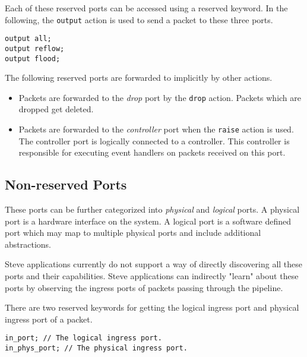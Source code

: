 Each of these reserved ports can be accessed using a reserved keyword. In the
following, the \texttt{output} action is used to send a packet to these three
ports.

\begin{codepage}
\begin{lstlisting}
output all;
output reflow;
output flood;
\end{lstlisting}
\end{codepage}

The following reserved ports are forwarded to implicitly by other actions.

\begin{itemize}
\item Packets are forwarded to the \textit{drop} port by the \texttt{drop} action.
Packets which are dropped get deleted.

\item Packets are forwarded to the \textit{controller} port when the 
\texttt{raise} action is used.
The controller port is logically connected to a controller.
This controller is responsible for executing event handlers on packets
received on this port. 
\end{itemize}

\subsection{Non-reserved Ports} \label{tut:regular_ports}

These ports can be further categorized into \textit{physical} and
\textit{logical} ports. A physical port is a hardware interface on the system. A
logical port is a software defined port which may map to multiple physical ports
and include additional abstractions.

Steve applications currently do not support a way of directly discovering all
these ports and their capabilities. Steve applications can indirectly "learn"
about these ports by observing the ingress ports of packets passing
through the pipeline.

There are two reserved keywords for getting the logical ingress port and physical ingress port of a packet.

\begin{codepage}
\begin{lstlisting}
in_port; // The logical ingress port.
in_phys_port; // The physical ingress port.
\end{lstlisting}
\end{codepage}

